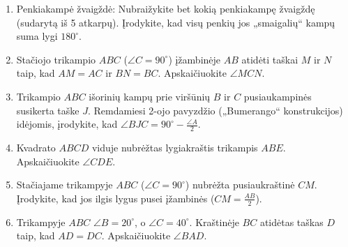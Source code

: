 \documentclass[11pt,a4paper]{scrartcl}
\begin{document}
\begin{enumerate}
    \item Penkiakampė žvaigždė: Nubraižykite bet kokią penkiakampę žvaigždę (sudarytą iš 5 atkarpų). Įrodykite, kad visų penkių jos „smaigalių“ kampų suma lygi $180^\circ$.
    \begin{center}
    \end{center}
    
    \item Stačiojo trikampio $ABC$ ($\angle C = 90^\circ$) įžambinėje $AB$ atidėti taškai $M$ ir $N$ taip, kad $AM = AC$ ir $BN = BC$. Apskaičiuokite $\angle MCN$.
    \item Trikampio $ABC$ išorinių kampų prie viršūnių $B$ ir $C$ pusiaukampinės susikerta taške $J$. Remdamiesi 2-ojo pavyzdžio („Bumerango“ konstrukcijos) idėjomis, įrodykite, kad $\angle BJC = 90^\circ - \frac{\angle A}{2}$.
    \item Kvadrato $ABCD$ viduje nubrėžtas lygiakraštis trikampis $ABE$. Apskaičiuokite $\angle CDE$.
    
    \item Stačiajame trikampyje $ABC$ ($\angle C = 90^\circ$) nubrėžta pusiaukraštinė $CM$. Įrodykite, kad jos ilgis lygus pusei įžambinės ($CM = \frac{AB}{2}$).
    \item Trikampyje $ABC$ $\angle B = 20^\circ$, o $\angle C = 40^\circ$. Kraštinėje $BC$ atidėtas taškas $D$ taip, kad $AD = DC$. Apskaičiuokite $\angle BAD$.
\end{enumerate}
\end{document}
